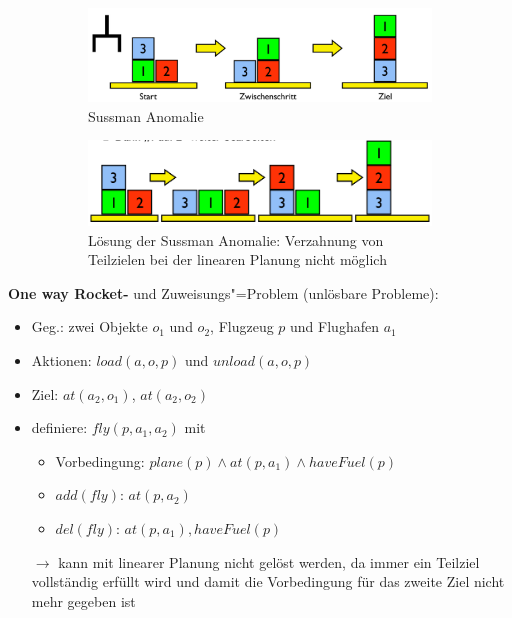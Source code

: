\begin{figure}[!ht]\centering
	\begin{subfigure}{.8\textwidth} 
		\includegraphics[width=\textwidth]{figures/ch06_sussman.png}
		\caption{Sussman Anomalie}
		\label{ch06_sussman}
	\end{subfigure}
	\begin{subfigure}{.8\textwidth} 
		\includegraphics[width=\textwidth]{figures/ch06_sm-lsg.png}
		\caption{L\"{o}sung der Sussman Anomalie: Verzahnung von Teilzielen bei der linearen Planung nicht möglich}
		\label{ch06_sm-lsg}
	\end{subfigure}
	\caption{}
\end{figure}
\newpage
\textbf{One way Rocket-} und Zuweisungs"=Problem (unlösbare Probleme):
\begin{itemize}
	\item Geg.: zwei Objekte $o_1$ und $o_2$, Flugzeug $p$ und Flughafen $a_1$
	\item Aktionen: $load(a,o,p)$ und $unload(a,o,p)$
	\item Ziel: $at(a_2, o_1)$, $at(a_2, o_2)$
	\item definiere: $fly(p,a_1,a_2)$ mit
	\begin{itemize}
		\item Vorbedingung: $plane(p) \wedge at(p,a_1) \wedge haveFuel(p)$
		\item $add(fly)$: $at(p,a_2)$
		\item $del(fly)$: $at(p,a_1), haveFuel(p)$
	\end{itemize}
	\item[$\rightarrow$] kann mit linearer Planung nicht gelöst werden, da immer ein Teilziel vollständig erfüllt wird und damit die Vorbedingung für das zweite Ziel nicht mehr gegeben ist
\end{itemize}

